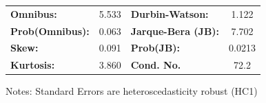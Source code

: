 \begin{center}
\begin{tabular}{lcccccc}
\bottomrule
\end{tabular}
\begin{tabular}{lclc}
\textbf{Omnibus:}       &  5.533 & \textbf{  Durbin-Watson:     } &    1.122  \\
\textbf{Prob(Omnibus):} &  0.063 & \textbf{  Jarque-Bera (JB):  } &    7.702  \\
\textbf{Skew:}          &  0.091 & \textbf{  Prob(JB):          } &   0.0213  \\
\textbf{Kurtosis:}      &  3.860 & \textbf{  Cond. No.          } &     72.2  \\
\bottomrule
\end{tabular}
\end{center}

Notes: \newline
 [1] Standard Errors are heteroscedasticity robust (HC1)
